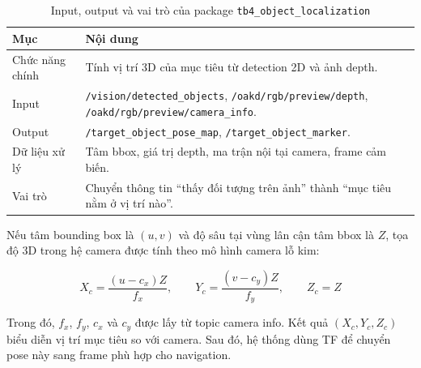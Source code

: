 \begin{table}[H]
    \centering
    \caption{Input, output và vai trò của package \texttt{tb4\_object\_localization}}
    \label{tab:tb4-object-localization}
    \renewcommand{\arraystretch}{1.25}
    \small
    \begin{tabularx}{\textwidth}{|>{\raggedright\arraybackslash}p{}|>{\raggedright\arraybackslash}X|}
        \hline
        \textbf{Mục} & \textbf{Nội dung} \\
        \hline
        Chức năng chính & Tính vị trí 3D của mục tiêu từ detection 2D và ảnh depth. \\
        \hline
        Input & \texttt{/vision/detected\_objects}, \texttt{/oakd/rgb/preview/depth}, \texttt{/oakd/rgb/preview/camera\_info}. \\
        \hline
        Output & \texttt{/target\_object\_pose\_map}, \texttt{/target\_object\_marker}. \\
        \hline
        Dữ liệu xử lý & Tâm bbox, giá trị depth, ma trận nội tại camera, frame cảm biến. \\
        \hline
        Vai trò & Chuyển thông tin ``thấy đối tượng trên ảnh'' thành ``mục tiêu nằm ở vị trí nào''. \\
        \hline
    \end{tabularx}
\end{table}

Nếu tâm bounding box là $(u, v)$ và độ sâu tại vùng lân cận tâm bbox là $Z$, tọa độ 3D trong hệ camera được tính theo mô hình camera lỗ kim:

\begin{equation}
    X_c = \frac{(u-c_x)Z}{f_x}, \qquad
    Y_c = \frac{(v-c_y)Z}{f_y}, \qquad
    Z_c = Z
    \label{eq:camera-to-3d}
\end{equation}

Trong đó, $f_x$, $f_y$, $c_x$ và $c_y$ được lấy từ topic camera info. Kết quả $(X_c, Y_c, Z_c)$ biểu diễn vị trí mục tiêu so với camera. Sau đó, hệ thống dùng TF để chuyển pose này sang frame phù hợp cho navigation.

